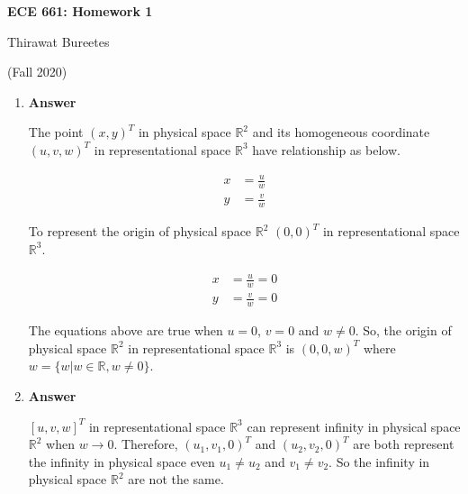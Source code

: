 \documentclass[11pt]{article}
\begin{document}
\begin{center}
\Large{\textbf{ECE 661: Homework 1}}

Thirawat Bureetes

(Fall 2020)
\end{center}
	

\begin{enumerate}
 

\item 
\noindent\textbf{Answer}

The point $(x, y)^T$ in physical space $\mathbb{R}^2$ and its homogeneous coordinate $(u,v,w)^T$ in representational space $\mathbb{R}^3$ have relationship as below.

\begin{align*}
x &= \frac{u}{w} \\
y &= \frac{v}{w}
\end{align*}

To represent the origin of physical space $\mathbb{R}^2$ $(0,0)^T$ in representational space $\mathbb{R}^3$.

\begin{align*}
x &= \frac{u}{w} = 0\\
y &= \frac{v}{w} = 0
\end{align*}

The equations above are true when $u = 0$, $v = 0$ and $w \neq 0$. So, the origin of physical space $\mathbb{R}^2$ in representational space $\mathbb{R}^3$ is $(0, 0, w)^T$ where $w = \{w|w \in \mathbb{R}, w \neq 0\}$.


\item 
\noindent\textbf{Answer}

$[u,v,w]^T$ in representational space $\mathbb{R}^3$ can represent infinity in physical space $\mathbb{R}^2$ when $w \to 0$. Therefore, $(u_1,v_1,0)^T$ and $(u_2,v_2,0)^T$ are both represent the infinity in physical space even $u_1 \neq u_2$ and $v_1 \neq v_2$. So  the infinity in physical space $\mathbb{R}^2$ are not the same.



\end{enumerate}
\end{document}
